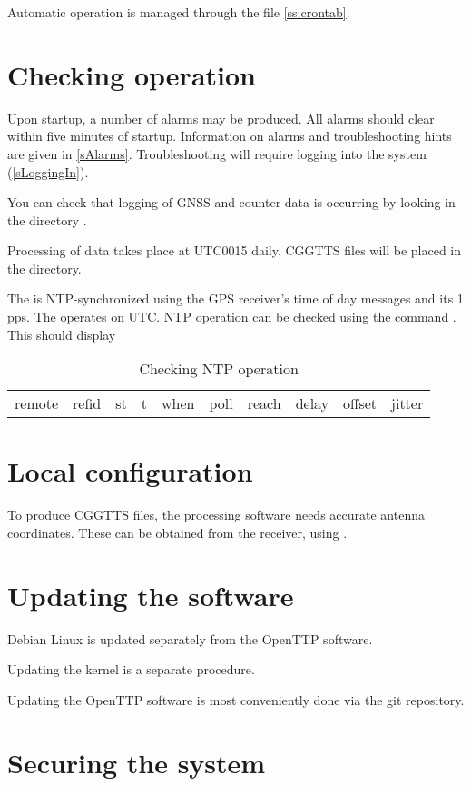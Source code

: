 Automatic operation is managed through the   file \ref{ss:crontab}.
\section{Checking  operation}

Upon startup, a number of alarms may be produced. 
All alarms should clear within five minutes of startup.
Information on alarms and troubleshooting hints are given in \ref{sAlarms}. Troubleshooting
will require logging into the system (\ref{sLoggingIn}).

You can check that logging of GNSS and counter data is occurring by looking in the directory 
.

Processing of data takes place at UTC0015 daily. CGGTTS files will be placed in the 
 directory.

The \sysname{} is NTP-synchronized using the GPS receiver's time of day messages and its 1 pps. 
The \sysname{} operates on UTC. 
NTP operation can be checked using the command . This should display 

\begin{table}
\begin{tabular}{clrrrrrrrr}
     remote      &     refid   &   st & t &  when &poll & reach  &  delay &  offset & jitter \\

\end{tabular}
\caption{Checking NTP operation}
\end{table}

\section{Local configuration}

To produce CGGTTS files, the processing software needs accurate antenna coordinates.
These can be obtained from the \sysname{} receiver, using .

\section{Updating the software}

Debian Linux is updated separately from the OpenTTP software.

Updating the kernel is a separate procedure. 

Updating the OpenTTP software is most conveniently done via the git repository.


\section{Securing the system}



